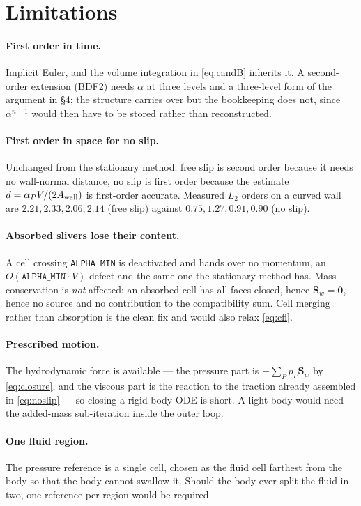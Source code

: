 \documentclass[11pt,a4paper]{article}
\theoremstyle{remark}
\newcommand{\Sw}{\bm{S}_w}
\begin{document}
\section{Limitations}

\paragraph{First order in time.} Implicit Euler, and the volume integration in
\eqref{eq:candB} inherits it. A second-order extension (BDF2) needs $\alpha$ at three levels and
a three-level form of the argument in \S4; the structure carries over but the bookkeeping does
not, since $\alpha^{n-1}$ would then have to be stored rather than reconstructed.

\paragraph{First order in space for no slip.} Unchanged from the stationary method: free slip is
second order because it needs no wall-normal distance, no slip is first order because the
estimate $d=\alpha_PV/(2A_{\rm wall})$ is first-order accurate. Measured $L_2$ orders on a curved
wall are $2.21, 2.33, 2.06, 2.14$ (free slip) against $0.75, 1.27, 0.91, 0.90$ (no slip).

\paragraph{Absorbed slivers lose their content.} A cell crossing \texttt{ALPHA\_MIN} is
deactivated and hands over no momentum, an $O(\texttt{ALPHA\_MIN}\cdot V)$ defect and the same
one the stationary method has. Mass conservation is \emph{not} affected: an absorbed cell has all
faces closed, hence $\Sw=\bm{0}$, hence no source and no contribution to the compatibility sum.
Cell merging rather than absorption is the clean fix and would also relax \eqref{eq:cfl}.

\paragraph{Prescribed motion.} The hydrodynamic force is available --- the pressure part is
$-\sum_P p_P\Sw$ by \eqref{eq:closure}, and the viscous part is the reaction to the traction
already assembled in \eqref{eq:noslip} --- so closing a rigid-body ODE is short. A light body
would need the added-mass sub-iteration inside the outer loop.

\paragraph{One fluid region.} The pressure reference is a single cell, chosen as the fluid cell
farthest from the body so that the body cannot swallow it. Should the body ever split the fluid
in two, one reference per region would be required.
\end{document}
